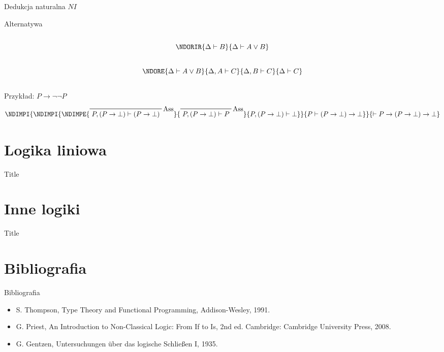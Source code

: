 \documentclass{beamer}
\newcommand{\imp}{\rightarrow}
\newcommand{\NDASS}[1]{\prfbyaxiom{Ass}{#1}}
\begin{document}
\begin{frame}{Dedukcja naturalna $NI$}
\begin{block}{Alternatywa}
\begin{columns}
      \begin{column}{0.5\textwidth}
        $$
        \NDORIR
          {\Delta \vdash B}
          {\Delta \vdash A \lor B}
        $$
      \end{column}
    \end{columns}

    \begin{columns}
      \begin{column}{1\textwidth}
        $$
        \NDORE {\Delta \vdash A \lor B} {\Delta, A \vdash C} {\Delta, B \vdash C}
          {\Delta \vdash C}
        $$
      \end{column}

    \end{columns}
  \end{block}

\end{frame}

\begin{frame}{Przykład: $P \imp \neg \neg P$}
  $$
    \NDIMPI {
      \NDIMPI {
        \NDIMPE 
          { \NDASS {P, (P \imp \bot) \vdash (P \imp \bot)} }
          { \NDASS {P, (P \imp \bot) \vdash P} }
          { P, (P \imp \bot) \vdash \bot }
      } 
      { P \vdash (P \imp \bot) \imp \bot }
    }
    { \vdash P \imp (P \imp \bot) \imp \bot }
  $$
\end{frame}

\section{Logika liniowa}
\begin{frame}{Title}
    
\end{frame}

\section{Inne logiki}
\begin{frame}{Title}
    
\end{frame}

\section*{Bibliografia}
\begin{frame}{Bibliografia}
    \begin{itemize}
      \item S. Thompson, Type Theory and Functional Programming, Addison-Wesley, 1991.
      \item G. Priest, An Introduction to Non-Classical Logic: From If to Is, 2nd ed. Cambridge: Cambridge University Press, 2008.
      \item G. Gentzen, Untersuchungen über das logische Schließen I, 1935.
    \end{itemize}
\end{frame}
\end{document}
